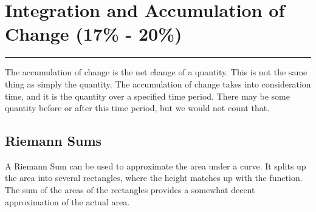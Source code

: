 \documentclass[12pt]{article}
\newcommand{\fline}{\par\noindent\rule{\textwidth}{0.1pt}} %
\begin{document}
    \section{Integration and Accumulation of Change (17\% - 20\%)}
    \fline

        The accumulation of change is the net change of a quantity. This is not the same thing as simply the quantity. The accumulation of change takes into consideration time, and it is the quantity over a specified time period. There may be some quantity before or after this time period, but we would not count that.

        \subsection{Riemann Sums}
            A Riemann Sum can be used to approximate the area under a curve. It splits up the area into several rectangles, where the height matches up with the function. The sum of the areas of the rectangles provides a somewhat decent approximation of the actual area.
\end{document}
